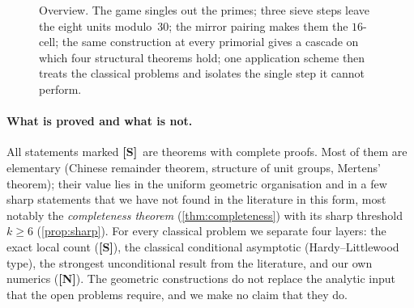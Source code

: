 \documentclass[11pt,a4paper]{article}
\newcommand{\statS}{\textsf{\textbf{[S]}}}
\newcommand{\statN}{\textsf{\textbf{[N]}}}
\theoremstyle{plain}
\theoremstyle{definition}
\theoremstyle{remark}
\begin{document}
\begin{figure}[!htbp]
\centering
{}
\caption{Overview. The game singles out the primes; three sieve steps leave the
eight units modulo~$30$; the mirror pairing makes them the $16$-cell; the same
construction at every primorial gives a cascade on which four structural
theorems hold; one application scheme then treats the classical problems and
isolates the single step it cannot perform.}
\label{fig:overview}
\end{figure}

\paragraph{What is proved and what is not.}
All statements marked \statS\ are theorems with complete proofs. Most of them
are elementary (Chinese remainder theorem, structure of unit groups, Mertens'
theorem); their value lies in the uniform geometric organisation and in a few
sharp statements that we have not found in the literature in this form, most
notably the \emph{completeness theorem} (\cref{thm:completeness}) with its sharp
threshold $k\ge6$ (\cref{prop:sharp}). For every classical problem we separate
four layers: the exact local count (\statS), the classical conditional
asymptotic (Hardy--Littlewood type), the strongest unconditional result from
the literature, and our own numerics (\statN). The geometric constructions do
not replace the analytic input that the open problems require, and we make no
claim that they do.
\end{document}
